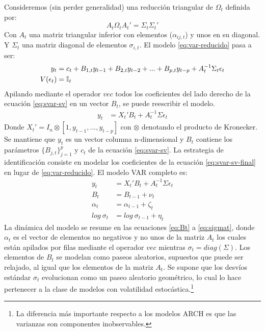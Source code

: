 \documentclass[12pt,oneside]{reedthesis}
\begin{document}
Consideremos (sin perder generalidad) una reducción triangular de \(\Omega_t\) definida por:
\begin{equation}
A_t\Omega_tA_t' = \Sigma_t\Sigma_t'
\end{equation}
Con \(A_t\) una matriz triangular inferior con elementos (\(\alpha_{ij,t}\)) y unos en su diagonal. Y \(\Sigma_t\) una matriz diagonal de elementos \(\sigma_{i, t}\). El modelo \eqref{eq:var-reducido} pasa a ser:
\begin{align}
y_t &= c_t + B_{1,t}y_{t-1} + B_{2,t}y_{t-2} + ... + B_{p,t}y_{t-p} + A_t^{-1}\Sigma_t\epsilon_t \label{eq:svar-sv} \\
V(\epsilon_t) &= \mathbb{I}_t \notag
\end{align}
Apilando mediante el operador \(vec\) todos los coeficientes del lado derecho de la ecuación \eqref{eq:svar-sv} en un vector \(B_t\), se puede reescribir el modelo.
\begin{align}
y_t  &= X_t'B_t + A_t^{-1}\Sigma \epsilon_t \label{eq:svar-sv-final}
\end{align}
Donde \(X_t' = I_n \otimes [1, y_{t-1}, ..., y_{t-p}]\) con \(\otimes\) denotando el producto de Kronecker. Se mantiene que \(y_t\) es un vector columna n-dimensional y \(B_t\) contiene los parámetros \(\{B_{j,t}\}_{j=1}^p\) y \(c_t\) de la ecuación \eqref{eq:svar-sv}.
La estrategia de identificación consiste en modelar los coeficientes de la ecuación \eqref{eq:svar-sv-final} en lugar de \eqref{eq:var-reducido}. El modelo VAR completo es:
\begin{align}
y_t  &= X_t'B_t + A_t^{-1}\Sigma\epsilon_t \label{eq:yt}\\
B_t &= B_{t-1} + \nu_t \label{eq:Bt}\\
\alpha_t &= \alpha_{t-1} + \zeta_t \label{eq:alphat}\\
log \ \sigma_t &= log \ \sigma_{t-1} + \eta_t \label{eq:sigmat}
\end{align}
La dinámica del modelo se resume en las ecuaciones \eqref{eq:Bt} a \eqref{eq:sigmat}, donde \(\alpha_t\) es el vector de elementos no negativos y no unos de la matriz \(A_t\) los cuales están apilados por filas mediante el operador \(vec\) mientras \(\sigma_t = diag(\Sigma)\). Los elementos de \(B_t\) se modelan como paseos aleatorios, supuestos que puede ser relajado, al igual que los elementos de la matriz \(A_t\). Se supone que los desvíos estándar \(\sigma_t\) evolucionan como un paseo aleatorio geométrico, lo cual lo hace pertenecer a la clase de modelos con volatilidad estocástica.\footnote{La diferencia más importante respecto a los modelos ARCH es que las varianzas son componentes inobservables.}
\end{document}
